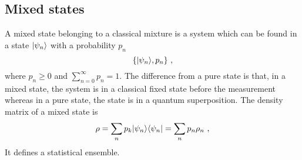 \subsection{Mixed states}

    A mixed state belonging to a classical mixture is a system which can be found in a state $\vert\psi_n\rangle$ with a probability $p_n$
    \begin{equation*}
        \{\vert\psi_n\rangle, p_n\} ~,
    \end{equation*}
    where $p_n \geq 0$ and $\sum_{n=0}^{\infty} p_n = 1$. The difference from a pure state is that, in a mixed state, the system is in a classical fixed state before the measurement whereas in a pure state, the state is in a quantum superposition. The density matrix of a mixed state is 
    \begin{equation}\label{mix}
        \rho = \sum_n p_k \vert\psi_n\rangle \langle\psi_n\vert = \sum_n p_n \rho_n ~,
    \end{equation}
    It defines a statistical ensemble. 

